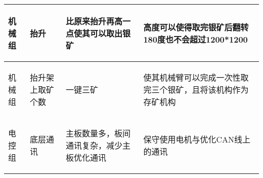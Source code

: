 \begin{longtable}{ p{1.5cm} | p{3cm} | p{6cm} | p{4.3cm} |}
    \hline

        \begin{center}
            机械组
        \end{center}&
        \begin{center}
            抬升
        \end{center}&
        \begin{center}
            比原来抬升再高一点使其可以取出银矿
        \end{center}&
        \begin{center}
            高度可以使得取完银矿后翻转180度也不会超过1200*1200
        \end{center}\\
        
    \hline
    
        \begin{center}
            机械组
        \end{center} &
        \begin{center}
            抬升架上取矿个数
        \end{center} &
        \begin{center}
            一键三矿
        \end{center} &
        \begin{center}
            使其机械臂可以完成一次性取完三个银矿，且将该机构作为存矿机构
        \end{center} \\

    \hline
    
        \begin{center}
            电控组
        \end{center} &
        \begin{center}
            底层通讯
        \end{center} &
        \begin{center}
            主板数量多，板间通讯复杂，减少主板优化通讯
        \end{center} &
        \begin{center}
            保守使用电机与优化CAN线上的通讯
        \end{center} \\


\end{longtable}
